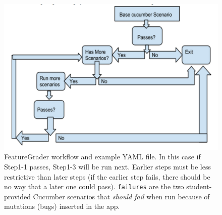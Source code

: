 \begin{figure}
  \begin{minipage}{0.45\textwidth}%
  \includegraphics[width=\textwidth]{figs/feature_grader.pdf}%
  \end{minipage}%
  \begin{minipage}{0.55\textwidth}%
  \end{minipage}
  \caption{\label{fig:cucumber}%
FeatureGrader workflow and example YAML file.  In this case if Step1-1 passes,
Step1-3 will be run next.  Earlier steps must be less restrictive than
later steps (if the earlier step fails, there should be no way that a later one could pass).
\texttt{failures} are the two student-provided Cucumber scenarios that \emph{should fail} when
run because of mutations (bugs) inserted in the app.
}
\end{figure}
